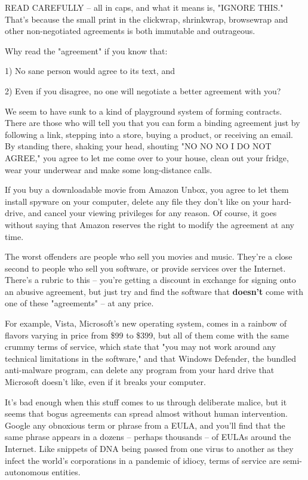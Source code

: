 READ CAREFULLY -- all in caps, and what it means is, "IGNORE THIS."
That's because the small print in the clickwrap, shrinkwrap,
browsewrap and other non-negotiated agreements is both immutable
and outrageous.

Why read the "agreement" if you know that:

1) No sane person would agree to its text, and

2) Even if you disagree, no one will negotiate a better agreement
with you?

We seem to have sunk to a kind of playground system of forming
contracts. There are those who will tell you that you can form a
binding agreement just by following a link, stepping into a store,
buying a product, or receiving an email. By standing there, shaking
your head, shouting "NO NO NO I DO NOT AGREE," you agree to let me
come over to your house, clean out your fridge, wear your underwear
and make some long-distance calls.

If you buy a downloadable movie from Amazon Unbox, you agree to let
them install spyware on your computer, delete any file they don't
like on your hard-drive, and cancel your viewing privileges for any
reason. Of course, it goes without saying that Amazon reserves the
right to modify the agreement at any time.

The worst offenders are people who sell you movies and music.
They're a close second to people who sell you software, or provide
services over the Internet. There's a rubric to this -- you're
getting a discount in exchange for signing onto an abusive
agreement, but just try and find the software that \textbf{doesn't}
come with one of these "agreements" -- at any price.

For example, Vista, Microsoft's new operating system, comes in a
rainbow of flavors varying in price from \$99 to \$399, but all of
them come with the same crummy terms of service, which state that
"you may not work around any technical limitations in the
software," and that Windows Defender, the bundled anti-malware
program, can delete any program from your hard drive that Microsoft
doesn't like, even if it breaks your computer.

It's bad enough when this stuff comes to us through deliberate
malice, but it seems that bogus agreements can spread almost
without human intervention. Google any obnoxious term or phrase
from a EULA, and you'll find that the same phrase appears in a
dozens -- perhaps thousands -- of EULAs around the Internet. Like
snippets of DNA being passed from one virus to another as they
infect the world's corporations in a pandemic of idiocy, terms of
service are semi-autonomous entities.

